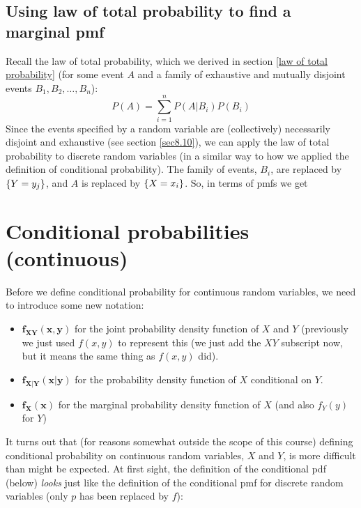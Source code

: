 \subsection{Using law of total probability to find a marginal pmf}
Recall the law of total probability, which we derived in section \ref{law of total probability} (for some event $A$ and a family of exhaustive and mutually disjoint events $B_1,B_2,\ldots,B_n$):
\[
P(A) = \sum_{i = 1}^n P(A|B_i)P(B_i)
\]
Since the events specified by a random variable are (collectively) necessarily disjoint and exhaustive (see section \ref{sec8.10}), we can apply the law of total probability to discrete random variables (in a similar way to how we applied the definition of conditional probability). The family of events, $B_i$, are replaced by $\left\{Y = y_j\right\}$, and $A$ is replaced by $\left\{X = x_i\right\}$. So, in terms of pmfs we get
  
  	\bigskip
	
	\hfil{}
	\bigskip
	\bigskip
	
\section{Conditional probabilities (continuous)} \label{f_{XY}(x,y),f_{X|Y}(x|y),f_X(x)}
Before we define conditional probability for continuous random variables, we need to introduce some new notation:
\begin{itemize}
\item $\boldsymbol{f_{XY}(x,y)}$ for the joint probability density function of $X$ and $Y$ (previously we just used $f(x,y)$ to represent this (we just add the $XY$ subscript now, but it means the same thing as $f(x,y)$ did).
\item $\boldsymbol{f_{X|Y}(x|y)}$ for the probability density function of $X$ conditional on $Y$.
\item $\boldsymbol{f_X(x)}$ for the marginal probability density function of $X$ (and also $f_Y(y)$ for $Y$)
\end{itemize}
It turns out that (for reasons somewhat outside the scope of this course) defining conditional probability on continuous random variables, $X$ and $Y$, is more difficult than might be expected. At first sight, the definition of the conditional pdf (below) \textit{looks} just like the definition of the conditional pmf for discrete random variables (only $p$ has been replaced by $f$):
  
